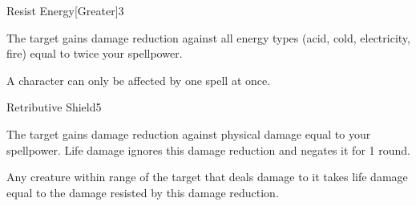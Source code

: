 \begin{spellsection}{Resist Energy}[Greater]{3}
    \begin{spellheader}
    \end{spellheader}
    \begin{spellcontent}
        \begin{spelltargetinginfo}
        \end{spelltargetinginfo}
        \begin{spelleffects}
            \spelleffect The target gains damage reduction against all energy types (acid, cold, electricity, fire) equal to twice your spellpower.
            \spelldur \durpersonallong
        \end{spelleffects}
    \end{spellcontent}
    \begin{spellfooter}
        \spellnotes A character can only be affected by one  spell at once.
        \miscastexplode
    \end{spellfooter}
\end{spellsection}

\begin{spellsection}{Retributive Shield}{5}
    \begin{spellheader}
    \end{spellheader}
    \begin{spellcontent}
        \begin{spelltargetinginfo}
        \end{spelltargetinginfo}
        \begin{spelleffects}
            \spelleffect The target gains damage reduction against physical damage equal to your spellpower. Life damage ignores this damage reduction and negates it for 1 round.
            
            \par Any creature within \rngmed range of the target that deals damage to it takes life damage equal to the damage resisted by this damage reduction.
            \spelldur \durshort
        \end{spelleffects}
    \end{spellcontent}
    \begin{spellfooter}
        \miscastrandom
    \end{spellfooter}
\end{spellsection}

